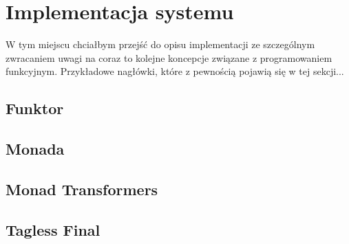 \documentclass[../main.tex]{subfiles}
\begin{document}
\section{Implementacja systemu}
W tym miejscu chciałbym przejść do opisu implementacji ze szczególnym zwracaniem uwagi na coraz to kolejne koncepcje związane z programowaniem funkcyjnym.\newline\vspace{7ex}
Przykładowe nagłówki, które z pewnością pojawią się w tej sekcji...

\subsection{Funktor}
\subsection{Monada}
\subsection{Monad Transformers}
\subsection{Tagless Final}
\end{document}
